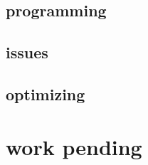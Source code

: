 \documentclass[compress,red]{beamer}
\begin{document}
\subsection{programming}

\subsection{issues}

\subsection{optimizing}

\section{work pending}
\end{document}
